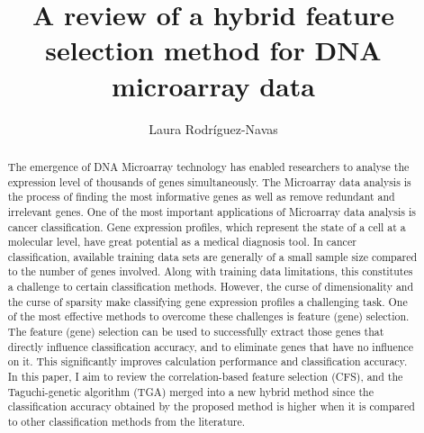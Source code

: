 \documentclass[runningheads]{llncs}
\begin{document}
%
\title{A review of a hybrid feature selection method for DNA microarray data}
%
%
\author{Laura Rodríguez-Navas}
%
%
%
\maketitle              %
%
\begin{abstract}
The emergence of DNA Microarray technology has enabled researchers to analyse the expression level of thousands of genes simultaneously. The Microarray data analysis is the process of finding the most informative genes as well as remove redundant and irrelevant genes. One of the most important applications of Microarray data analysis is cancer classification. Gene expression profiles, which represent the state of a cell at a molecular level, have great potential as a medical diagnosis tool. In cancer classification, available training data sets are generally of a small sample size compared to the number of genes involved. Along with training data limitations, this constitutes a challenge to certain classification methods. However, the curse of dimensionality and the curse of sparsity make classifying gene expression profiles a challenging task. One of the most effective methods to overcome these challenges is feature (gene) selection. The feature (gene) selection can be used to successfully extract those genes that directly influence classification accuracy, and to eliminate genes that have no influence on it. This significantly improves calculation performance and classification accuracy. In this paper, I aim to review the correlation-based feature selection (CFS), and the Taguchi-genetic algorithm (TGA) merged into a new hybrid method since the classification accuracy obtained by the proposed method is higher when it is compared to other classification methods from the literature.


\end{abstract}
%
%
%
\end{document}
